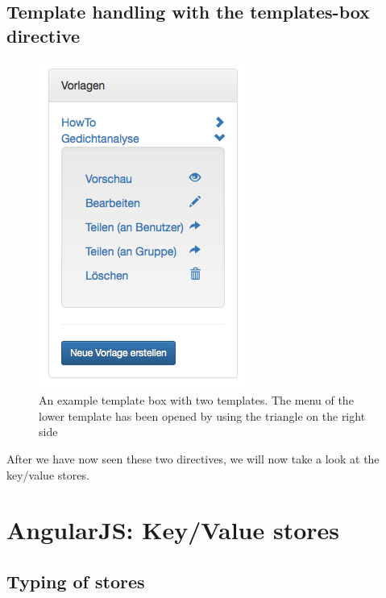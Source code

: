 \subsection{Template handling with the templates-box directive}
\begin{figure}[th]
\centerline{\includegraphics[width=.5\textwidth]{gfx/templateBox}}
\caption{An example template box with two templates. The menu of the lower template has been opened by using the triangle on the right side}
\label{templateBox}
\end{figure}

After we have now seen these two directives, we will now take a look at the key/value stores.
\section{AngularJS: Key/Value stores}
\label{keyValueService}

\subsection{Typing of stores}